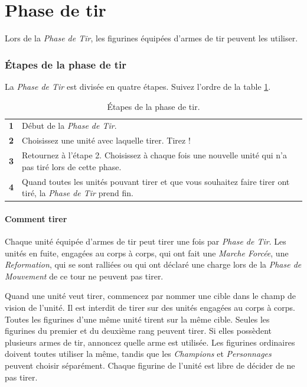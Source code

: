 
\part{Phase de tir}

Lors de la \emph{Phase de Tir}, les figurines équipées d'armes de tir peuvent les utiliser.

\section{Étapes de la phase de tir}

La \emph{Phase de Tir} est divisée en quatre étapes. Suivez l'ordre de la table \ref{table/etapes_tir}.

\begin{table}[!htbp]
\centering
\begin{tabular}{c|m{12cm}}
\textbf{1} & Début de la \emph{Phase de Tir}. \tabularnewline
\textbf{2} & Choisissez une unité avec laquelle tirer. Tirez ! \tabularnewline
\textbf{3} & Retournez à l'étape 2. Choisissez à chaque fois une nouvelle unité qui n'a pas tiré lors de cette phase. \tabularnewline
\textbf{4} & Quand toutes les unités pouvant tirer et que vous souhaitez faire tirer ont tiré, la \emph{Phase de Tir} prend fin. \tabularnewline
\end{tabular}
\caption{\label{table/etapes_tir}Étapes de la phase de tir.}
\end{table}

\subsection{Comment tirer}

Chaque unité équipée d'armes de tir peut tirer une fois par \emph{Phase de Tir}. Les unités en fuite, engagées au corps à corps, qui ont fait une \emph{Marche Forcée}, une \emph{Reformation}, qui se sont ralliées ou qui ont déclaré une charge lors de la \emph{Phase de Mouvement} de ce tour ne peuvent pas tirer.

Quand une unité veut tirer, commencez par nommer une cible dans le champ de vision de l'unité. Il est interdit de tirer sur des unités engagées au corps à corps. Toutes les figurines d'une même unité tirent sur la même cible. Seules les figurines du premier et du deuxième rang peuvent tirer. Si elles possèdent plusieurs armes de tir, annoncez quelle arme est utilisée. Les figurines ordinaires doivent toutes utiliser la même, tandis que les \emph{Champions} et \emph{Personnages} peuvent choisir séparément. Chaque figurine de l'unité est libre de décider de ne pas tirer.

